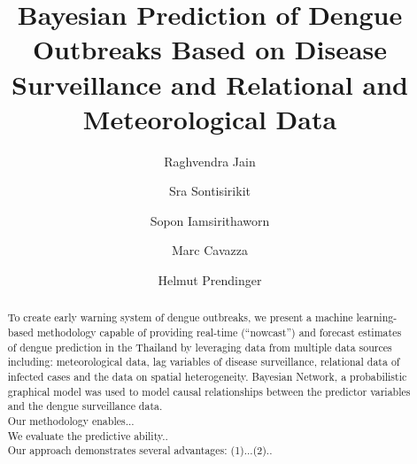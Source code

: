 \documentclass[review]{elsarticle}
\begin{document}
\begin{frontmatter}


\title{Bayesian Prediction of Dengue Outbreaks Based on Disease Surveillance and Relational and  Meteorological Data}



\author[label1]{Raghvendra Jain}
\author[label2]{Sra  Sontisirikit}
\author[label3]{Sopon Iamsirithaworn}
\author[label4]{Marc Cavazza}
\author[label1]{Helmut Prendinger}


\address[label1]{{jain@nii.ac.jp, helmut@nii.ac.jp}\\
	National Institute of Informatics, \\
	2-1-2 Hitotsubashi, Chiyoda-ku, Tokyo, 101-8430, Japan\\}


\address[label2] {{arttioz@gmail.com} \\ 
	Asian Institute of Technology, School of Engineering and Technology, Thailand}

\address[label3]{{iamsiri@gmail.com}\\
	Department of Disease Control Thirteenth Division, Bangkok, Thailand}

\address[label4]{{M.O.Cavazza@kent.ac.uk} \\ 
	School of Engineering and Digital Arts, University of Kent} 



\begin{abstract}
To create early warning system of dengue outbreaks, we present a machine learning-based methodology capable of providing real-time (“nowcast”) and forecast estimates of dengue prediction in the Thailand by leveraging data from multiple data sources including: meteorological data, lag variables of disease surveillance, relational data of infected cases and  the data on spatial heterogeneity. Bayesian Network, a probabilistic graphical model was used to model causal relationships between the predictor variables and the dengue surveillance data.  \\
Our methodology enables...\\
We evaluate the predictive ability..\\
Our approach demonstrates several advantages: (1)...(2)..





\end{abstract}
\end{frontmatter}
\end{document}
